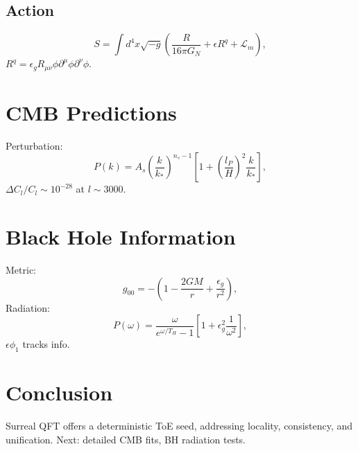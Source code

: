 \documentclass{article}
\begin{document}
\subsection{Action}
\begin{equation}
S = \int d^4x \sqrt{-g} \left( \frac{R}{16\pi G_N} + \epsilon R^q + \mathcal{L}_m \right),
\end{equation}
\(R^q = \epsilon_g R_{\mu\nu} \phi \partial^\mu \phi \partial^\nu \phi\).

\section{CMB Predictions}
Perturbation:
\begin{equation}
P(k) = A_s \left( \frac{k}{k_*} \right)^{n_s-1} \left[ 1 + \left( \frac{l_P}{H} \right)^2 \frac{k}{k_*} \right],
\end{equation}
\(\Delta C_l / C_l \sim 10^{-28}\) at \(l \sim 3000\).

\section{Black Hole Information}
Metric:
\begin{equation}
g_{00} = -\left( 1 - \frac{2GM}{r} + \frac{\epsilon_g}{r^2} \right),
\end{equation}
Radiation:
\begin{equation}
P(\omega) = \frac{\omega}{e^{\omega/T_H} - 1} \left[ 1 + \epsilon_g^2 \frac{1}{\omega^2} \right],
\end{equation}
\(\epsilon \phi_1\) tracks info.

\section{Conclusion}
Surreal QFT offers a deterministic ToE seed, addressing locality, consistency, and unification. Next: detailed CMB fits, BH radiation tests.
\end{document}
